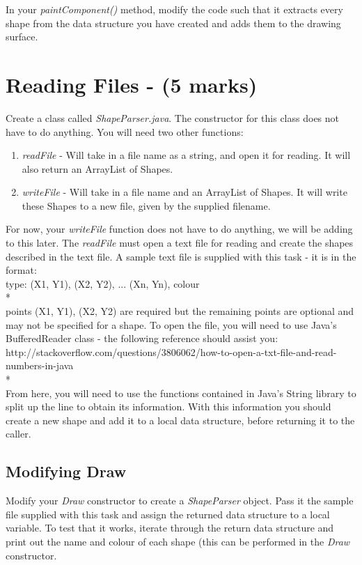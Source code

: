 \documentclass[a4paper,12pt]{article}
\begin{document}
In your \textit{paintComponent()} method, modify the code such that it extracts every shape from the data structure you have created and adds them to the drawing surface.

\newpage
\section{Reading Files - (5 marks)}
Create a class called \textit{ShapeParser.java}. The constructor for this class does not have to do anything. You will need two other functions:
\begin{enumerate}
\item \textit{readFile} - Will take in a file name as a string, and open it for reading. It will also return an ArrayList of Shapes.
\item \textit{writeFile} - Will take in a file name and an ArrayList of Shapes. It will write these Shapes to a new file, given by the supplied filename.
\end{enumerate}
For now, your \textit{writeFile} function does not have to do anything, we will be adding to this later. The \textit{readFile} must open a text file for reading and create the shapes described in the text file. A sample text file is supplied with this task - it is in the format:\\

type: (X1, Y1), (X2, Y2), ... (Xn, Yn), colour\\*
\\
points (X1, Y1), (X2, Y2) are required but the remaining points are optional and may not be specified for a shape. To open the file, you will need to use Java's BufferedReader class - the following reference should assist you:\\

http://stackoverflow.com/questions/3806062/how-to-open-a-txt-file-and-read-numbers-in-java\\*
\\
From here, you will need to use the functions contained in Java's String library to split up the line to obtain its information. With this information you should create a new shape and add it to a local data structure, before returning it to the caller. 

\subsection{Modifying Draw}
Modify your \textit{Draw} constructor to create a \textit{ShapeParser} object. Pass it the sample file supplied with this task and assign the returned data structure to a local variable. To test that it works, iterate through the return data structure and print out the name and colour of each shape (this can be performed in the \textit{Draw} constructor.
\end{document}
